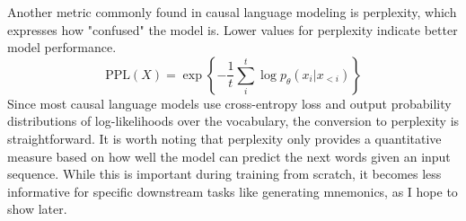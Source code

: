 Another metric commonly found in causal language modeling is perplexity, which expresses how "confused" the model is. Lower values for perplexity indicate better model performance.
\begin{equation}
    \text{PPL}(X) = \exp \left\{ {-\frac{1}{t}\sum_i^t \log p_\theta (x_i|x_{<i}) } \right\}
\end{equation}
Since most causal language models use cross-entropy loss and output probability distributions of log-likelihoods over the vocabulary, the conversion to perplexity is straightforward. It is worth noting that perplexity only provides a quantitative measure based on how well the model can predict the next words given an input sequence. While this is important during training from scratch, it becomes less informative for specific downstream tasks like generating mnemonics, as I hope to show later.

